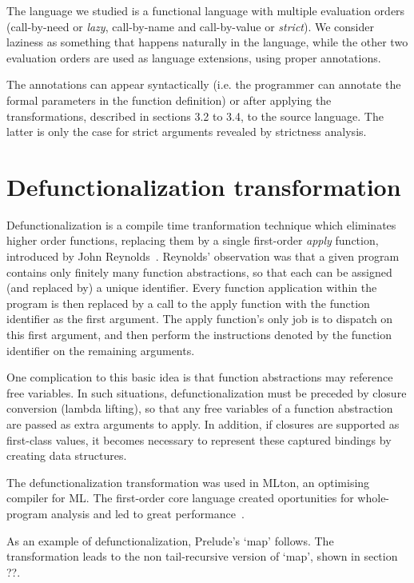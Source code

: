 \documentclass[diploma]{softlab-thesis}
\begin{document}
The language we studied is a functional language 
with multiple evaluation orders (call-by-need or 
\textit{lazy}, call-by-name and call-by-value or \textit{strict}).
We consider laziness as something that happens naturally in the language, while 
the other two evaluation orders are used as language extensions,
using proper annotations.

The annotations can appear syntactically (i.e. the programmer can annotate 
the formal parameters in the function definition) or 
after applying the transformations, described in sections 3.2 to 3.4, 
to the source language. The latter
is only the case for strict arguments revealed by strictness analysis.

\section {Defunctionalization transformation}
\label{sec:defunctionalization}

Defunctionalization is a compile time tranformation technique which eliminates higher order 
functions, replacing them by a single first-order \textit{apply} function, introduced by John Reynolds~\cite{Reynolds72definitionalinterpreters}.
Reynolds' observation was that a given program contains only finitely many function abstractions, so that each can 
be assigned (and replaced by) a unique identifier. Every function application within the program is then replaced 
by a call to the apply function with the function identifier as the first argument. The apply function's only job is 
to dispatch on this first argument, and then perform the instructions denoted by the function identifier on the 
remaining arguments.

One complication to this basic idea is that function abstractions may reference free variables. In such situations, 
defunctionalization must be preceded by closure conversion (lambda lifting), so that any free variables of a function 
abstraction are passed as extra arguments to apply. In addition, if closures are supported as first-class values, 
it becomes necessary to represent these captured bindings by creating data structures.

The defunctionalization transformation was used in MLton, an optimising compiler for ML. The first-order
core language created oportunities for whole-program analysis and led to great performance~\cite{mlton}.

As an example of defunctionalization, Prelude's `map' follows. The transformation leads to 
the non tail-recursive version of `map', shown in section ??.
\end{document}
